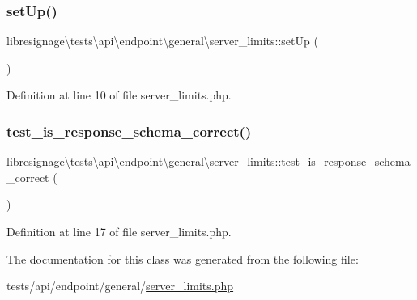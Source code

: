 \subsubsection{\texorpdfstring{set\+Up()}{setUp()}}
{\footnotesize\ttfamily libresignage\textbackslash{}tests\textbackslash{}api\textbackslash{}endpoint\textbackslash{}general\textbackslash{}server\+\_\+limits\+::set\+Up (\begin{DoxyParamCaption}{ }\end{DoxyParamCaption})}



Definition at line 10 of file server\+\_\+limits.\+php.

\mbox{\label{classlibresignage_1_1tests_1_1api_1_1endpoint_1_1general_1_1server__limits_ad39f78e6fa03143e26123e3c86bfdf32}} 
\subsubsection{\texorpdfstring{test\+\_\+is\+\_\+response\+\_\+schema\+\_\+correct()}{test\_is\_response\_schema\_correct()}}
{\footnotesize\ttfamily libresignage\textbackslash{}tests\textbackslash{}api\textbackslash{}endpoint\textbackslash{}general\textbackslash{}server\+\_\+limits\+::test\+\_\+is\+\_\+response\+\_\+schema\+\_\+correct (\begin{DoxyParamCaption}{ }\end{DoxyParamCaption})}



Definition at line 17 of file server\+\_\+limits.\+php.



The documentation for this class was generated from the following file\+:\begin{DoxyCompactItemize}
\item 
tests/api/endpoint/general/\hyperlink{tests_2api_2endpoint_2general_2server__limits_8php}{server\+\_\+limits.\+php}\end{DoxyCompactItemize}
